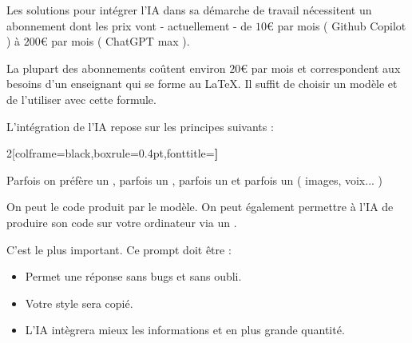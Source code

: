 \bcattention Les solutions pour intégrer l'IA dans sa démarche de travail nécessitent un abonnement dont les prix vont - actuellement - de $10$\euro{} par mois ( Github Copilot ) à $200$\euro{} par mois ( ChatGPT max ).

La plupart des abonnements  coûtent environ $20$\euro{} par mois et correspondent aux besoins d'un enseignant qui se forme au \LaTeX. 
Il suffit de choisir un modèle et de l'utiliser avec cette formule. 
\begin{Methode}
    L'intégration de l'IA repose sur les principes suivants : 


    \begin{MultiColonnes}{2}[colframe=black,boxrule=0.4pt,fonttitle=\bfseries]%

        \tcbitem[title=Un modèle] Parfois on préfère un , parfois un , parfois un  et parfois un  ( images, voix... )

        \tcbitem[title=Un système d'intégration] On peut  le code produit par le modèle. On peut également permettre à l'IA de produire son code sur votre ordinateur via un .

        \tcbitem[raster multicolumn=2, title=Des prompts] C'est le plus important. Ce prompt doit être : 
        \begin{itemize}[label=$\bullet$]
            \item {} \hfill Permet une réponse sans bugs et sans oubli.
            \item {} \hfill Votre style sera copié.
            \item {} \hfill L'IA intègrera mieux les informations et en plus grande quantité.
        \end{itemize}
    \end{MultiColonnes}
\end{Methode}
